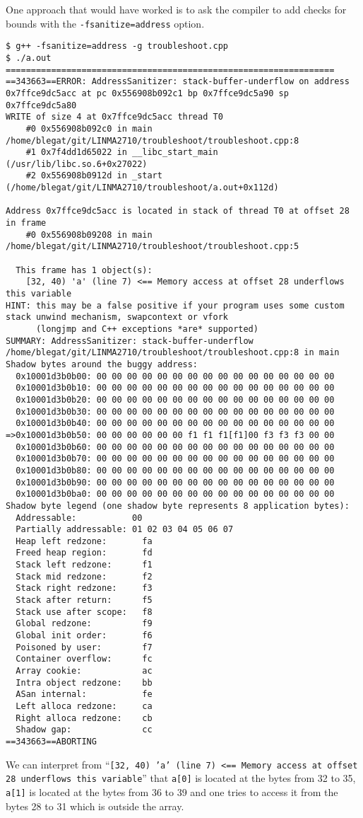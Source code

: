 \documentclass{article}
\begin{document}
One approach that would have worked is to ask the compiler to add checks for bounds with the \texttt{-fsanitize=address} option.
\begin{verbatim}
$ g++ -fsanitize=address -g troubleshoot.cpp
$ ./a.out
=================================================================
==343663==ERROR: AddressSanitizer: stack-buffer-underflow on address 0x7ffce9dc5acc at pc 0x556908b092c1 bp 0x7ffce9dc5a90 sp 0x7ffce9dc5a80
WRITE of size 4 at 0x7ffce9dc5acc thread T0
    #0 0x556908b092c0 in main /home/blegat/git/LINMA2710/troubleshoot/troubleshoot.cpp:8
    #1 0x7f4dd1d65022 in __libc_start_main (/usr/lib/libc.so.6+0x27022)
    #2 0x556908b0912d in _start (/home/blegat/git/LINMA2710/troubleshoot/a.out+0x112d)

Address 0x7ffce9dc5acc is located in stack of thread T0 at offset 28 in frame
    #0 0x556908b09208 in main /home/blegat/git/LINMA2710/troubleshoot/troubleshoot.cpp:5

  This frame has 1 object(s):
    [32, 40) 'a' (line 7) <== Memory access at offset 28 underflows this variable
HINT: this may be a false positive if your program uses some custom stack unwind mechanism, swapcontext or vfork
      (longjmp and C++ exceptions *are* supported)
SUMMARY: AddressSanitizer: stack-buffer-underflow /home/blegat/git/LINMA2710/troubleshoot/troubleshoot.cpp:8 in main
Shadow bytes around the buggy address:
  0x10001d3b0b00: 00 00 00 00 00 00 00 00 00 00 00 00 00 00 00 00
  0x10001d3b0b10: 00 00 00 00 00 00 00 00 00 00 00 00 00 00 00 00
  0x10001d3b0b20: 00 00 00 00 00 00 00 00 00 00 00 00 00 00 00 00
  0x10001d3b0b30: 00 00 00 00 00 00 00 00 00 00 00 00 00 00 00 00
  0x10001d3b0b40: 00 00 00 00 00 00 00 00 00 00 00 00 00 00 00 00
=>0x10001d3b0b50: 00 00 00 00 00 00 f1 f1 f1[f1]00 f3 f3 f3 00 00
  0x10001d3b0b60: 00 00 00 00 00 00 00 00 00 00 00 00 00 00 00 00
  0x10001d3b0b70: 00 00 00 00 00 00 00 00 00 00 00 00 00 00 00 00
  0x10001d3b0b80: 00 00 00 00 00 00 00 00 00 00 00 00 00 00 00 00
  0x10001d3b0b90: 00 00 00 00 00 00 00 00 00 00 00 00 00 00 00 00
  0x10001d3b0ba0: 00 00 00 00 00 00 00 00 00 00 00 00 00 00 00 00
Shadow byte legend (one shadow byte represents 8 application bytes):
  Addressable:           00
  Partially addressable: 01 02 03 04 05 06 07
  Heap left redzone:       fa
  Freed heap region:       fd
  Stack left redzone:      f1
  Stack mid redzone:       f2
  Stack right redzone:     f3
  Stack after return:      f5
  Stack use after scope:   f8
  Global redzone:          f9
  Global init order:       f6
  Poisoned by user:        f7
  Container overflow:      fc
  Array cookie:            ac
  Intra object redzone:    bb
  ASan internal:           fe
  Left alloca redzone:     ca
  Right alloca redzone:    cb
  Shadow gap:              cc
==343663==ABORTING
\end{verbatim}
We can interpret from ``\texttt{[32, 40) 'a' (line 7) <== Memory access at offset 28 underflows this variable}'' that \texttt{a[0]} is located at the bytes from 32 to 35, \texttt{a[1]} is located at the bytes from 36 to 39 and one tries to access it from the bytes 28 to 31 which is outside the array.
\end{document}

